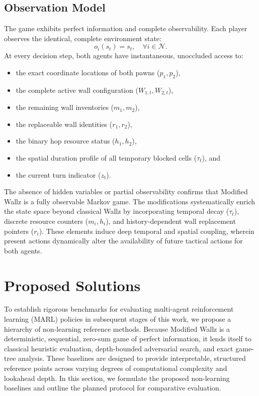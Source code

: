 \documentclass{article}
\begin{document}
\subsection{Observation Model}
\label{subsec:observation_model}

The game exhibits perfect information and complete observability. Each player observes the identical, complete environment state:
\begin{equation}
o_i(s_t) = s_t, \quad \forall i \in \mathcal{N}.
\end{equation}
At every decision step, both agents have instantaneous, unoccluded access to:
\begin{itemize}
    \item the exact coordinate locations of both pawns ($p_1, p_2$),
    \item the complete active wall configuration ($W_{1,t}, W_{2,t}$),
    \item the remaining wall inventories ($m_1, m_2$),
    \item the replaceable wall identities ($r_1, r_2$),
    \item the binary hop resource status ($h_1, h_2$),
    \item the spatial duration profile of all temporary blocked cells ($\tau_t$), and
    \item the current turn indicator ($z_t$).
\end{itemize}
The absence of hidden variables or partial observability confirms that Modified Wallz is a fully observable Markov game. The modifications systematically enrich the state space beyond classical Wallz by incorporating temporal decay ($\tau_t$), discrete resource counters ($m_i, h_i$), and history-dependent wall replacement pointers ($r_i$). These elements induce deep temporal and spatial coupling, wherein present actions dynamically alter the availability of future tactical actions for both agents.

\section{Proposed Solutions}
\label{sec:proposed_solutions}

To establish rigorous benchmarks for evaluating multi-agent reinforcement learning (MARL) policies in subsequent stages of this work, we propose a hierarchy of non-learning reference methods. Because Modified Wallz is a deterministic, sequential, zero-sum game of perfect information, it lends itself to classical heuristic evaluation, depth-bounded adversarial search, and exact game-tree analysis. These baselines are designed to provide interpretable, structured reference points across varying degrees of computational complexity and lookahead depth. In this section, we formulate the proposed non-learning baselines and outline the planned protocol for comparative evaluation.
\end{document}
